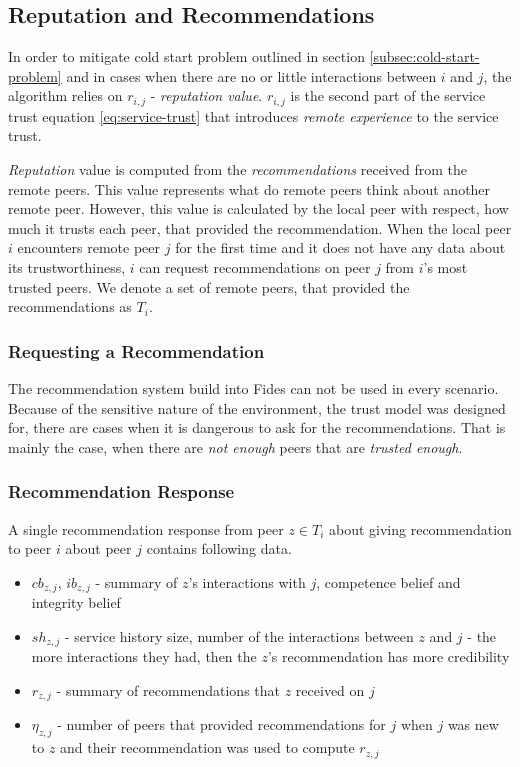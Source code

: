 \subsection{Reputation and Recommendations}
In order to mitigate cold start problem outlined in section \ref{subsec:cold-start-problem} and in cases when there are no or little interactions between $i$ and $j$, the algorithm relies on $r_{i,j}$ - \textit{reputation value}. 
$r_{i,j}$ is the second part of the service trust equation \ref{eq:service-trust} that introduces \textit{remote experience} to the service trust.

\textit{Reputation} value is computed from the \textit{recommendations} received from the remote peers. This value represents what do remote peers think about another remote peer. However, this value is calculated by the local peer with respect, how much it trusts each peer, that provided the recommendation.
When the local peer $i$ encounters remote peer $j$ for the first time and it does not have any data about its trustworthiness, $i$ can request recommendations on peer $j$ from $i$'s most trusted peers.
We denote a set of remote peers, that provided the recommendations as $T_{i}$.

\subsubsection{Requesting a Recommendation}
The recommendation system build into Fides can not be used in every scenario.
Because of the sensitive nature of the environment, the trust model was designed for, there are cases when it is dangerous to ask for the recommendations.
That is mainly the case, when there are \textit{not enough} peers that are \textit{trusted enough}.

\subsubsection{Recommendation Response}
A single recommendation response from peer $z \in T_{i}$ about giving recommendation to peer $i$ about peer $j$ contains following data.
\begin{itemize}
    \item $cb_{z,j}$, $ib_{z,j}$ - summary of $z$'s interactions with $j$, competence belief and integrity belief
    \item $sh_{z,j}$ - service history size, number of the interactions between $z$ and $j$ - the more interactions they had, then the $z$'s recommendation has more credibility
    \item $r_{z, j}$ - summary of recommendations that $z$ received on $j$
    \item $\eta_{z,j}$ - number of peers that provided recommendations for $j$ when $j$ was new to $z$ and their recommendation was used to compute $r_{z,j}$
\end{itemize}

